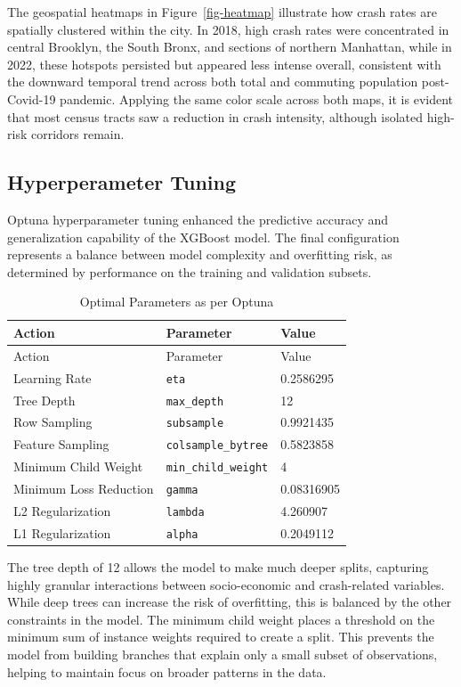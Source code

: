 \documentclass[
  number,
  review,
  3p]{elsarticle}
\begin{document}
The geospatial heatmaps in Figure~\ref{fig-heatmap} illustrate how crash
rates are spatially clustered within the city. In 2018, high crash rates
were concentrated in central Brooklyn, the South Bronx, and sections of
northern Manhattan, while in 2022, these hotspots persisted but appeared
less intense overall, consistent with the downward temporal trend across
both total and commuting population post-Covid-19 pandemic. Applying the
same color scale across both maps, it is evident that most census tracts
saw a reduction in crash intensity, although isolated high-risk
corridors remain.

\subsection{\texorpdfstring{\textbf{Hyperperameter
Tuning}}{Hyperperameter Tuning}}\label{hyperperameter-tuning}

Optuna hyperparameter tuning \citep{optuna} enhanced the predictive
accuracy and generalization capability of the XGBoost model. The final
configuration represents a balance between model complexity and
overfitting risk, as determined by performance on the training and
validation subsets.

\begin{longtable}[]{@{}lll@{}}
\caption{Optimal Parameters as per Optuna}\tabularnewline
\toprule\noalign{}
Action & Parameter & Value \\
\midrule\noalign{}
\endfirsthead
\toprule\noalign{}
Action & Parameter & Value \\
\midrule\noalign{}
\endhead
\bottomrule\noalign{}
\endlastfoot
Learning Rate & \texttt{eta} & 0.2586295 \\
Tree Depth & \texttt{max\_depth} & 12 \\
Row Sampling & \texttt{subsample} & 0.9921435 \\
Feature Sampling & \texttt{colsample\_bytree} & 0.5823858 \\
Minimum Child Weight & \texttt{min\_child\_weight} & 4 \\
Minimum Loss Reduction & \texttt{gamma} & 0.08316905 \\
L2 Regularization & \texttt{lambda} & 4.260907 \\
L1 Regularization & \texttt{alpha} & 0.2049112 \\
\end{longtable}

The tree depth of 12 allows the model to make much deeper splits,
capturing highly granular interactions between socio-economic and
crash-related variables. While deep trees can increase the risk of
overfitting, this is balanced by the other constraints in the model. The
minimum child weight places a threshold on the minimum sum of instance
weights required to create a split. This prevents the model from
building branches that explain only a small subset of observations,
helping to maintain focus on broader patterns in the data.
\end{document}
